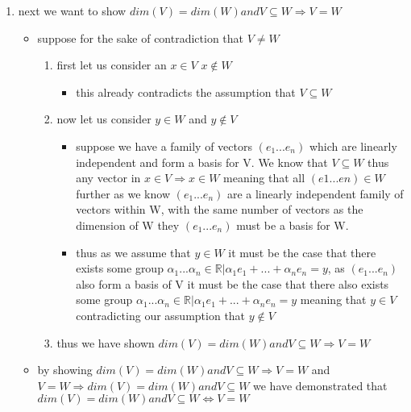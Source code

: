 \documentclass[12pt,twoside]{article}
\begin{document}
\begin{enumerate}[label=1.2]
\begin{enumerate}[label=1.5]
{\begin{enumerate}[label=Case A]
\end{enumerate}
\begin{enumerate}[label=Case B]
\item next we want to show $dim(V) = dim(W) and V \subseteq W \Rightarrow V=W$
\begin{itemize}
    \item suppose for the sake of contradiction that $V\neq W$ 
    \begin{enumerate}
        \item first let us consider an $x\in V$ $x\not \in W$
        \begin{itemize}
            \item this already contradicts the assumption that $V\subseteq W$ 
        \end{itemize}
        \item now let us consider $y\in W$ and $y \not \in V$
        \begin{itemize}
        \item suppose we have a family of vectors $(e_1...e_n)$ which are linearly independent and form a basis for V. We know that $V\subseteq W$ thus any vector in $x\in V \Rightarrow x\in W$ meaning that all $(e1...en)\in W$ further as we know $(e_1...e_n)$ are a linearly independent family of vectors within W, with the same number of vectors as the dimension of W they $(e_1...e_n)$ must be a basis for W. 
        \item thus as we assume that $y\in W$ it must be the case that there exists some group $\alpha_1...\alpha_n\in \mathbb{R}|\alpha_1 e_1+...+\alpha_n e_n=y$, as $(e_1...e_n)$ also form a basis of V it must be the case that there also exists  some group $\alpha_1...\alpha_n\in \mathbb{R}|\alpha_1 e_1+...+\alpha_n e_n=y$ meaning that $y\in V$ contradicting our assumption that $y\not \in V$
        \end{itemize}
        \item thus we have shown $dim(V) = dim(W) and V \subseteq W \Rightarrow V=W$ 
    \end{enumerate}
    \item by showing   $dim(V) = dim(W) and V \subseteq W \Rightarrow V=W$  and $V=W \Rightarrow dim(V) = dim(W ) and V \subseteq W$ we have demonstrated that $dim(V) = dim(W) and V \subseteq W \Longleftrightarrow  V=W$
\end{itemize}
\end{enumerate}
}
\end{enumerate}


\end{enumerate}
\end{document}
